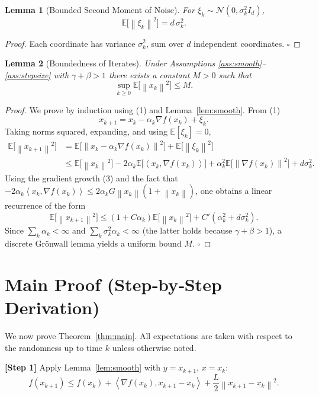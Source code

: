 \documentclass[11pt]{article}
\newtheorem{lemma}{Lemma}
\newcommand{\E}{\mathbb{E}}
\newcommand{\norm}[1]{\left\|#1\right\|}
\newcommand{\ip}[2]{\left\langle #1,#2\right\rangle}
\begin{document}
\begin{lemma}[Bounded Second Moment of Noise]\label{lem:noise}
For $\xi_k\sim\mathcal N(0,\sigma_k^2 I_d)$,
\[
\E\!\bigl[\norm{\xi_k}^2\bigr]=d\,\sigma_k^2 .
\tag{9}
\]
\end{lemma}
\begin{proof}
Each coordinate has variance $\sigma_k^2$, sum over $d$ independent
coordinates. \hfill $\square$
\end{proof}

\begin{lemma}[Boundedness of Iterates]\label{lem:boundedness}
Under Assumptions \ref{ass:smooth}–\ref{ass:stepsize} with
$\gamma+\beta>1$ there exists a constant $M>0$ such that
\[
\sup_{k\ge0}\E\!\bigl[\norm{x_k}^2\bigr]\le M .
\tag{10}
\]
\end{lemma}
\begin{proof}
We prove by induction using (1) and Lemma~\ref{lem:smooth}.  From (1)
\[
x_{k+1}=x_k-\alpha_k\nabla f(x_k)+\xi_k .
\]
Taking norms squared, expanding, and using $\E[\xi_k]=0$,
\[
\begin{aligned}
\E\!\bigl[\norm{x_{k+1}}^2\bigr]
&=\E\!\bigl[\norm{x_k-\alpha_k\nabla f(x_k)}^2\bigr]
   +\E\!\bigl[\norm{\xi_k}^2\bigr] \\[0.2em]
&\le \E\!\bigl[\norm{x_k}^2\bigr]
   -2\alpha_k\E\!\bigl[\ip{x_k}{\nabla f(x_k)}\bigr]
   +\alpha_k^2\E\!\bigl[\norm{\nabla f(x_k)}^2\bigr]
   +d\sigma_k^2 .
\end{aligned}
\tag{11}
\]
Using the gradient growth (3) and the fact that $-2\alpha_k\ip{x_k}{\nabla f(x_k)}
\le 2\alpha_k G \norm{x_k}(1+\norm{x_k})$, one obtains a linear
recurrence of the form
\[
\E\!\bigl[\norm{x_{k+1}}^2\bigr]\le (1+C\alpha_k)\E\!\bigl[\norm{x_k}^2\bigr]
      +C'(\alpha_k^2+d\sigma_k^2) .
\tag{12}
\]
Since $\sum_k\alpha_k<\infty$ and $\sum_k\sigma_k^2\alpha_k<\infty$
(the latter holds because $\gamma+\beta>1$), a discrete Grönwall lemma
yields a uniform bound $M$.  \hfill $\square$
\end{proof}

\section*{Main Proof (Step‑by‑Step Derivation)}
We now prove Theorem~\ref{thm:main}.  All expectations are taken with
respect to the randomness up to time $k$ unless otherwise noted.

\noindent\textbf{[Step 1]} Apply Lemma~\ref{lem:smooth} with
$y=x_{k+1}$, $x=x_k$:
\[
f(x_{k+1})\le f(x_k)+\ip{\nabla f(x_k)}{x_{k+1}-x_k}
            +\frac{L}{2}\norm{x_{k+1}-x_k}^2 .
\tag{13}
\]
\end{document}
